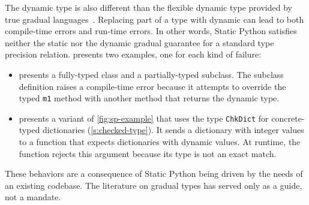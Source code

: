 \documentclass[english,cleveref,submission]{programming}
\newcommand{\SP}{Static Python}
\newcommand{\code}[1]{\texttt{#1}}
\begin{document}
The dynamic type is also different than the flexible dynamic type provided
by true gradual languages~\cite{svcb-snapl-2015}.
Replacing part of a type with dynamic can lead to both compile-time errors
and run-time errors.
In other words, \SP{} satisfies neither the static nor the dynamic gradual guarantee
for a standard type precision relation.
 presents two examples, one for each kind of failure:
\begin{itemize}
  \item
     presents a fully-typed class and a partially-typed subclass.
    The subclass definition raises a compile-time error because it attempts to override
    the typed \code{m1} method with another method that returns the dynamic type.



  \item
     presents a variant of \cref{fig:sp-example} that
    uses the type \code{ChkDict} for concrete-typed dictionaries (\cref{s:checked-type}).
    It sends a dictionary with integer values to a function that expects
    dictionaries with dynamic values.
    At runtime, the function rejects this argument because its type is not an
    exact match.
\end{itemize}
These behaviors are a consequence of \SP{} being driven by the needs of an
existing codebase.
The literature on gradual types has served only as a guide, not a mandate.
\end{document}
